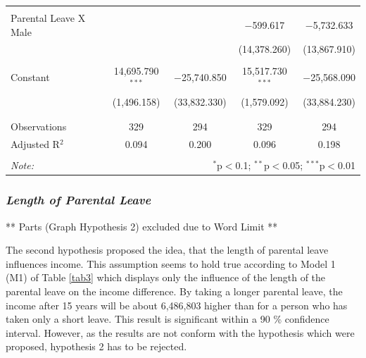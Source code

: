 \documentclass[
  11pt,
]{article}
\begin{document}
\begin{table}[!htbp]
\begin{tabular}{@{\extracolsep{-5pt}}lcccc}
  & & & & \\ 
 Parental Leave X Male &  &  & $-$599.617 & $-$5,732.633 \\ 
  &  &  & (14,378.260) & (13,867.910) \\ 
  & & & & \\ 
 Constant & 14,695.790$^{***}$ & $-$25,740.850 & 15,517.730$^{***}$ & $-$25,568.090 \\ 
  & (1,496.158) & (33,832.330) & (1,579.092) & (33,884.230) \\ 
  & & & & \\ 
\hline \\[-1.8ex] 
Observations & 329 & 294 & 329 & 294 \\ 
Adjusted R$^{2}$ & 0.094 & 0.200 & 0.096 & 0.198 \\ 
\hline 
\hline \\[-1.8ex] 
\textit{Note:}  & \multicolumn{4}{r}{$^{*}$p$<$0.1; $^{**}$p$<$0.05; $^{***}$p$<$0.01} \\ 
\end{tabular} 
\end{table}

\hypertarget{length-of-parental-leave}{%
\subsubsection*{\texorpdfstring{\emph{Length of Parental Leave}}{Length of Parental Leave}}\label{length-of-parental-leave}}

** Parts (Graph Hypothesis 2) excluded due to Word Limit **

The second hypothesis proposed the idea, that the length of parental leave influences income. This assumption seems to hold true according to Model 1 (M1) of Table \ref{tab3} which displays only the influence of the length of the parental leave on the income difference. By taking a longer parental leave, the income after 15 years will be about 6,486,803 higher than for a person who has taken only a short leave. This result is significant within a 90 \% confidence interval. However, as the results are not conform with the hypothesis which were proposed, hypothesis 2 has to be rejected.
\end{document}
